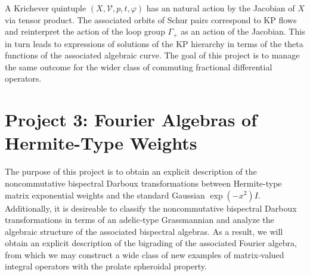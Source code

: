 \documentclass[11pt,letterpaper]{article}
\theoremstyle{definition}
\begin{document}
A Krichever quintuple $(X,\mathcal V,p,t,\varphi)$ has an natural action by the Jacobian of $X$ via tensor product.  The associated orbits of Schur pairs correspond to KP flows and reinterpret the action of the loop group $\Gamma_+$ as an action of the Jacobian.  This in turn leads to expressions of solutions of the KP hierarchy in terms of the theta functions of the associated algebraic curve.
The goal of this project is to manage the same outcome for the wider class of commuting fractional differential operators.

\section{Project 3: Fourier Algebras of Hermite-Type Weights}\label{sec:hermite}
The purpose of this project is to obtain an explicit description of the noncommutative bispectral Darboux transformations between Hermite-type matrix exponential weights and the standard Gaussian $\exp(-x^2)I$.
Additionally, it is desireable to classify the noncommutative bispectral Darboux transformations in terms of an adelic-type Grassmannian and analyze the algebraic structure of the associated bispectral algebras.
As a result, we will obtain an explicit description of the bigrading of the associated Fourier algebra, from which we may construct a wide class of new examples of matrix-valued integral operators with the prolate spheroidal property.
\end{document}
